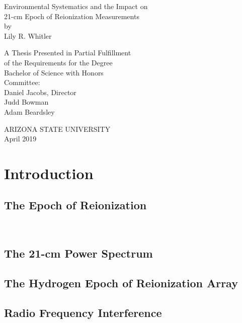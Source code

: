 \documentclass[12pt]{article}
\begin{document}
\begin{center}
	Environmental Systematics and the Impact on \\ 21-cm Epoch of Reionization Measurements \\
	by \\
	Lily R. Whitler
	
	\begin{spacing}{1}
		\vspace{0.15\textheight}
		A Thesis Presented in Partial Fulfillment \\
		of the Requirements for the Degree \\
		Bachelor of Science with Honors \\
		\vspace{0.22\textheight}
		Committee: \\
		Daniel Jacobs, Director \\
		Judd Bowman \\
		Adam Beardsley
	\end{spacing}

	\vspace{0.22\textheight}
	ARIZONA STATE UNIVERSITY \\
	April 2019
\end{center}
\thispagestyle{empty}
\newpage

\tableofcontents
\listoffigures
\listoftables
\newpage

\begin{abstract}
\end{abstract}

\section{Introduction}
\subsection{The Epoch of Reionization}
\cite{morales2010} \\
\cite{pritchard2012}
\subsection{The 21-cm Power Spectrum}
\subsection{The Hydrogen Epoch of Reionization Array}
\cite{deboer2017}
\subsection{Radio Frequency Interference}
\end{document}
